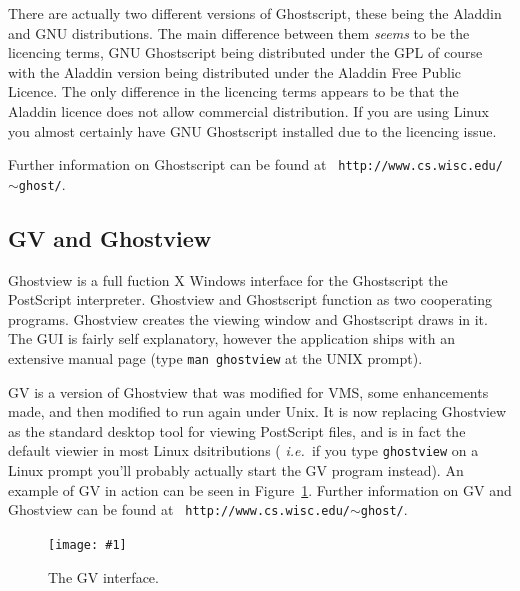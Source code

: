 \documentclass[twoside,11pt]{article}
\newcommand{\htmladdnormallink}[2]{#1}
\newcommand{\htmladdimg}[1]{}
\newcommand{\htmlref}[2]{#1}
\newcommand{\xlabel}[1]{}
\newcommand{\myfig}[5]{
  \begin{figure}
    \centering\texttt{[image: \#1]}
    \typeout{#1 inserted on page \arabic{page}}
    \caption{\label{#4}#5}
  \end{figure}
  }
\newcommand{\myfig}[5]{
    \label{#4} \htmladdimg{#3}\\
    Figure: #5\\
  }
\begin{document}
There are actually two different versions of
\htmladdnormallink{Ghostscript}{http://www.cs.wisc.edu/~ghost/aladdin/index.html},
these being the
\htmladdnormallink{Aladdin}{http://www.cs.wisc.edu/~ghost/aladdin/index.html}
and
\htmladdnormallink{GNU}{http://www.cs.wisc.edu/~ghost/gnu/index.html}
distributions. The main difference between them {\em seems} to be the
licencing terms, GNU Ghostscript being distributed under the
\htmladdnormallink{GPL}{http://www.gnu.org/copyleft/gpl.html} of
course with the Aladdin version being distributed under the
\htmladdnormallink{Aladdin Free Public
Licence}{http://www.cs.wisc.edu/~ghost/aladdin/doc/Public.htm}. The
only difference in the licencing terms appears to be that the Aladdin
licence does not allow commercial distribution. If you are using Linux
you almost certainly have GNU Ghostscript installed due to the
licencing issue.

Further information on Ghostscript can be found at
\htmladdnormallink{{\tt
http://www.cs.wisc.edu/$\sim$ghost/}}{http://www.cs.wisc.edu/~ghost/}.

\subsection{\xlabel{sc15_gv}GV and Ghostview\label{sc15_gv}}

\htmladdnormallink{Ghostview}{http://www.cs.wisc.edu/~ghost/ghostview/index.html}
is a full fuction X Windows interface for the
\htmlref{Ghostscript}{sc15_gs} the PostScript interpreter. Ghostview
and Ghostscript function as two cooperating programs. Ghostview
creates the viewing window and Ghostscript draws in it. The GUI is
fairly self explanatory, however the application ships with an
extensive manual page (type {\tt man ghostview} at the UNIX prompt).

\htmladdnormallink{GV}{http://www.cs.wisc.edu/~ghost/gv/index.html} is
a version of Ghostview that was modified for VMS, some enhancements
made, and then modified to run again under Unix. It is now replacing
Ghostview as the standard desktop tool for viewing PostScript files,
and is in fact the default viewier in most Linux dsitributions ({\em
i.e.\ }if you type {\tt ghostview} on a Linux prompt you'll probably
actually start the GV program instead). An example of GV in action can
be seen in Figure~\ref{sc15_gv_interface}. Further information on GV
and Ghostview can be found at \htmladdnormallink{{\tt
http://www.cs.wisc.edu/$\sim$ghost/}}{http://www.cs.wisc.edu/~ghost/}.

\myfig{sc15_gv.eps}{height=0.6\textheight}{sc15_gv.gif}{sc15_gv_interface}{The GV interface.}
\end{document}
